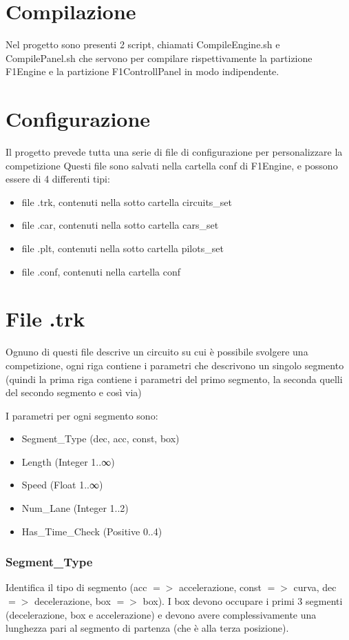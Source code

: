 \documentclass[a4paper,11pt, twoside]{book}
\begin{document}
    \section{Compilazione}
      Nel progetto sono presenti 2 script, chiamati CompileEngine.sh e CompilePanel.sh
      che servono per compilare rispettivamente la partizione F1Engine e la partizione F1ControllPanel
      in modo indipendente.
      
    \section{Configurazione}
      Il progetto prevede tutta una serie di file di configurazione per personalizzare la competizione
      Questi file sono salvati nella cartella conf di F1Engine, e possono essere di 4 differenti tipi:
      
      \begin{itemize}
	\item file .trk, contenuti nella sotto cartella circuits\_set 
	\item file .car, contenuti nella sotto cartella cars\_set
	\item file .plt, contenuti nella sotto cartella pilots\_set
	\item file .conf, contenuti nella cartella conf
      \end{itemize}
      
      \section{File .trk}
	Ognuno di questi file descrive un circuito su cui è possibile svolgere una competizione, ogni riga contiene i parametri
	che descrivono un singolo segmento (quindi la prima riga contiene i parametri del primo segmento, la seconda
	quelli del secondo segmento e così via)
	
	I parametri per ogni segmento sono:
	\begin{itemize}
	  \item Segment\_Type (dec, acc, const, box)
	  \item Length (Integer 1..∞)
	  \item Speed (Float 1..∞) 
	  \item Num\_Lane (Integer 1..2)
	  \item Has\_Time\_Check (Positive 0..4)
	\end{itemize}
	
	\subsubsection{Segment\_Type}
	  Identifica il tipo di segmento (acc $=>$ accelerazione, const $=>$ curva, dec $=>$ decelerazione, box $=>$ box). 
	  I box devono occupare i primi 3 segmenti (decelerazione, box e accelerazione) e devono avere complessivamente una lunghezza
	  pari al segmento di partenza (che è alla terza posizione).
\end{document}
